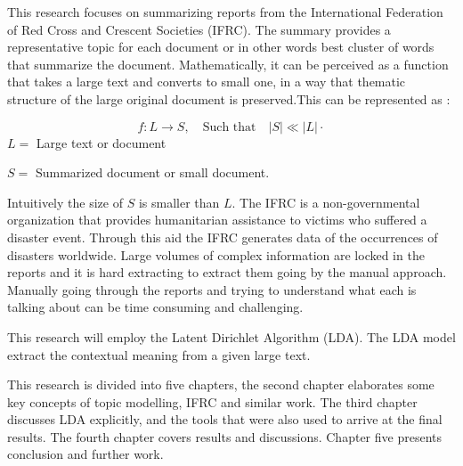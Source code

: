 This research focuses on summarizing reports from the International Federation of Red Cross and Crescent Societies (IFRC). The summary provides  a  representative topic for each document or in other words best cluster of words that summarize the document. Mathematically, it can be perceived as a function that takes a large text and converts to small one, in a way that thematic structure of the large original document is preserved.This can be represented as :

$$f:L \longrightarrow S, \quad \text{Such that} \quad |S|\ll |L| \cdot$$
$L=$ Large text or document

$S=$ Summarized document or small document.
  
Intuitively the size of $S$ is smaller than $L$.
The IFRC is a non-governmental organization
that provides humanitarian assistance to victims who suffered a disaster event. Through this aid the 	IFRC generates data of the occurrences of disasters worldwide. Large volumes of complex information    are locked in the reports and it is hard extracting to extract them going by the manual approach.
Manually going through the reports and trying to understand what each is talking about can be time consuming and challenging.  

This research will employ the Latent Dirichlet Algorithm (LDA).
The LDA model extract the contextual meaning from a given large text. 

This research is divided into five chapters, the second chapter elaborates some key concepts of topic modelling, IFRC and similar work. The third chapter discusses LDA explicitly,  and the tools that were also used to arrive at the final results. The fourth chapter covers results and discussions. Chapter five presents conclusion and further work.
